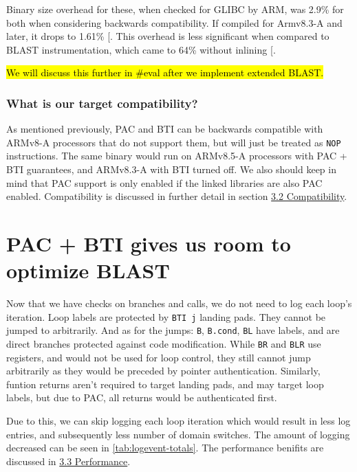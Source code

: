 \documentclass[a4paper, nobind]{templates/ociamthesis}
\begin{document}
Binary size overhead for these, when checked for GLIBC by ARM, was 2.9\% for both
when considering backwards compatibility. If compiled for Armv8.3-A and later,
it drops to 1.61\% {[}\citeproc{ref-arm-pacbti}{9}{]}.
This overhead is less significant when compared to BLAST instrumentation, which
came to 64\% without inlining {[}\citeproc{ref-blast}{56}{]}.

\hl{We will discuss this further in \#eval after we implement extended BLAST.}

\subsubsection{What is our target compatibility?}\label{what-is-our-target-compatibility}

As mentioned previously, PAC and BTI can be backwards compatible with ARMv8-A processors
that do not support them, but will just be treated as \texttt{NOP} instructions.
The same binary would run on ARMv8.5-A processors with PAC + BTI guarantees, and
ARMv8.3-A with BTI turned off.
We also should keep in mind that PAC support is only enabled if the linked libraries
are also PAC enabled.
Compatibility is discussed in further detail in section \hyperref[compatibility]{3.2 Compatibility}.

\section{PAC + BTI gives us room to optimize BLAST}\label{optimizing-blast}

Now that we have checks on branches and calls, we do not need to log each loop's iteration.
Loop labels are protected by \texttt{BTI\ j} landing pads. They cannot be jumped to arbitrarily.
And as for the jumps: \texttt{B}, \texttt{B.cond}, \texttt{BL} have labels, and are direct branches protected
against code modification.
While \texttt{BR} and \texttt{BLR} use registers, and would not be used for loop control,
they still cannot jump arbitrarily as they would be preceded by pointer authentication.
Similarly, funtion returns aren't required to target landing pads, and may target loop labels,
but due to PAC, all returns would be authenticated first.

Due to this, we can skip logging each loop iteration which would result in less
log entries, and subsequently less number of domain switches. The amount of logging
decreased can be seen in \ref{tab:logevent-totals}.
The performance benifits are discussed in \hyperref[performance]{3.3 Performance}.
\end{document}
